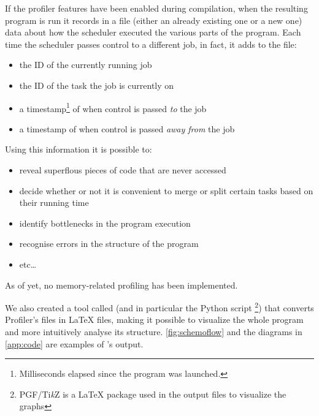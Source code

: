   If the profiler features have been enabled during compilation, when
  the resulting program is run it records in a  file
  (either an already existing one or a new one) data about how
  the scheduler executed the various parts of the program.
  Each time the scheduler passes control to a different job, in fact, it
  adds to the file:
  \begin{itemize}
    \item the ID of the currently running job
    \item the ID of the task the job is currently on
    \item a timestamp\footnote{\label{clock_note}Milliseconds elapsed
    since the program was launched.} of when control is passed
    \textit{to} the job
    \item a timestamp of when control is passed
    \textit{away from} the job
  \end{itemize}

  Using this information it is possible to:
  \begin{itemize}
    \item reveal superflous pieces of code that are never accessed
    \item decide whether or not it is convenient to merge or split
    certain tasks based on their running time
    \item identify bottlenecks in the program execution
    \item recognise errors in the structure of the program
    \item etc\ldots
  \end{itemize}
  As of yet, no memory-related profiling has been implemented.

  We also created a tool called \ScheMoTeX{} (and in particular the
  Python script \footnote{PGF/Ti\textit{k}Z is a
  \LaTeX{} package used in the output files to visualize the graphs})
  that converts \ScheMo{} Profiler's  files in \LaTeX{}
   files, making it possible to visualize the whole program
  and more intuitively analyse its structure. \autoref{fig:schemoflow}
  and the diagrams in \autoref{app:code} are examples of
  \ScheMoTeX{}'s output.
